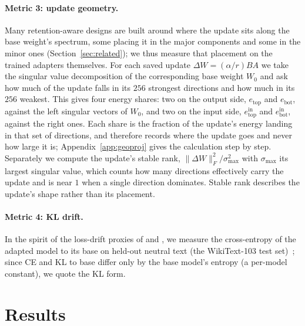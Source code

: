 \documentclass[11pt]{article}
\newcommand{\smax}{\sigma_{\max}}
\begin{document}
\paragraph{Metric 3: update geometry.} Many retention-aware designs are built
around where the update sits along the base weight's spectrum, some placing it
in the major components and some in the minor ones
(Section~\ref{sec:related}); we thus measure that placement on the trained
adapters themselves. For each saved update $\Delta W = (\alpha/r)BA$ we take
the singular value decomposition of the corresponding base weight $W_0$ and
ask how much of the update falls in its $256$ strongest directions and how
much in its $256$ weakest. This gives four energy shares: two on the output
side, $e_{\mathrm{top}}$ and $e_{\mathrm{bot}}$, against the left singular
vectors of $W_0$, and two on the input side,
$e^{\mathrm{in}}_{\mathrm{top}}$ and $e^{\mathrm{in}}_{\mathrm{bot}}$,
against the right ones. Each share is the fraction of the update's energy
landing in that set of directions, and therefore records where the update
goes and never how large it is; Appendix~\ref{app:geoproj} gives the
calculation step by step. Separately we compute the update's stable rank,
$\lVert\Delta W\rVert_F^2 / \smax^2$ with $\smax$ its largest singular value,
which counts how many directions effectively carry the update and is near $1$
when a single direction dominates. Stable rank describes the update's shape
rather than its placement.

\paragraph{Metric 4: KL drift.} In the spirit of the loss-drift
proxies of \citet{wang2024milora} and \citet{kalajdzievski2024scaling}, we
measure the cross-entropy of the adapted model to its base on held-out
neutral text (the WikiText-103 test set)~\citep{merity2017wikitext}; since CE and KL to base differ only by the base model's entropy
(a per-model constant), we quote the KL form.

\section{Results}\label{sec:results}
\end{document}
